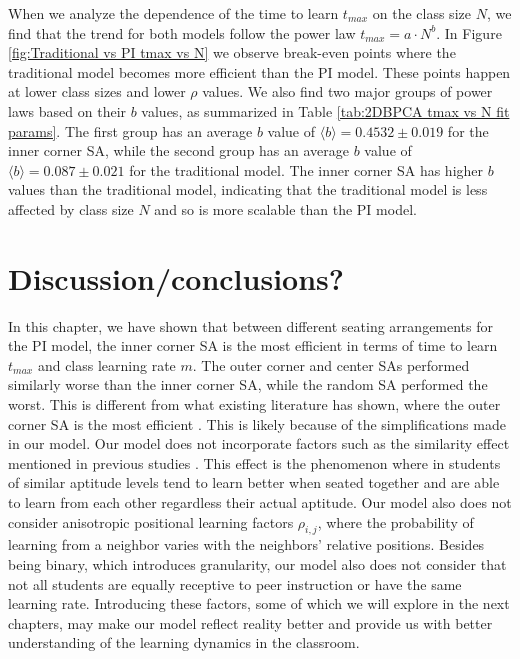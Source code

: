 When we analyze the dependence of the time to learn $t_{max}$ on the class size $N$, we find that the trend for both models follow the power law $t_{max} = a \cdot N^b$. 
In Figure \ref{fig:Traditional vs PI tmax vs N} we observe break-even points where the traditional model becomes more efficient than the PI model. 
These points happen at lower class sizes and lower $\rho$ values. We also find two major groups of power laws based on their $b$ values, as summarized in Table \ref{tab:2DBPCA tmax vs N fit params}. 
The first group has an average $b$ value of $\langle b \rangle = 0.4532 \pm 0.019$ for the inner corner SA, while the second group has an average $b$ value of $\langle b \rangle = 0.087\pm0.021$ for the traditional model. 
The inner corner SA has higher $b$ values than the traditional model, indicating that the traditional model is less affected by class size $N$ and so is more scalable than the PI model.

\section{Discussion/conclusions?}
In this chapter, we have shown that between different seating arrangements for the PI model, the inner corner SA is the most efficient in terms of time to learn $t_{max}$ and class learning rate $m$. 
The outer corner and center SAs performed similarly worse than the inner corner SA, while the random SA performed the worst. 
This is different from what existing literature has shown, where the outer corner SA is the most efficient \cite{roxas2010seating}. 
This is likely because of the simplifications made in our model. Our model does not incorporate factors such as the similarity effect mentioned in previous studies \cite{roxas2010seating,smith2009peer}. 
This effect is the phenomenon where in students of similar aptitude levels tend to learn better when seated together and are able to learn from each other regardless their actual aptitude. 
Our model also does not consider anisotropic positional learning factors $\rho_{i,j}$, where the probability of learning from a neighbor varies with the neighbors' relative positions. 
Besides being binary, which introduces granularity, our model also does not consider that not all students are equally receptive to peer instruction or have the same learning rate. 
Introducing these factors, some of which we will explore in the next chapters, may make our model reflect reality better and provide us with better understanding of the learning dynamics in the classroom.

